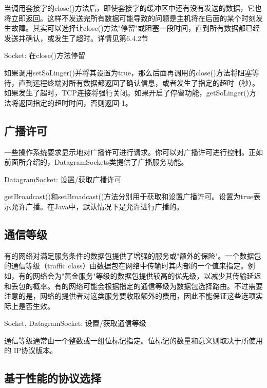 		当调用套接字的close()方法后，即使套接字的缓冲区中还有没有发送的数据，它也将立即返回。这样不发送完所有数据可能导致的问题是主机将在后面的某个时刻发生故障。其实可以选择让close()方法"停留"或阻塞一段时间，直到所有数据都已经发送并确认，或发生了超时。详情见第6.4.2节 

		Socket: 在close()方法停留 

		

		如果调用setSoLinger()并将其设置为true，那么后面再调用的close()方法将阻塞等待，直到远程终端对所有数据都返回了确认信息，或者发生了指定的超时（秒）。如果发生了超时，TCP连接将强行关闭。如果开启了停留功能，getSoLinger()方法将返回指定的超时时间，否则返回-1。 

	\subsection{广播许可}

		一些操作系统要求显示地对广播许可进行请求。你可以对广播许可进行控制。正如前面所介绍的，DatagramSockets类提供了广播服务功能。 

		DatagramSocket: 设置/获取广播许可 

		

		getBroadcast()和setBroadcast()方法分别用于获取和设置广播许可。设置为true表示允许广播。在Java中，默认情况下是允许进行广播的。 

	\subsection{通信等级}

		有的网络对满足服务条件的数据包提供了增强的服务或"额外的保险"。一个数据包的通信等级（traffic class）由数据包在网络中传输时其内部的一个值来指定。例如，有的网络会为"黄金服务"等级的数据包提供较高的优先级，以减少其传输延迟和丢包的概率。有的网络可能会根据指定的通信等级为数据包选择路由。不过需要注意的是，网络的提供者对这类服务要收取额外的费用，因此不能保证这些选项实际上是否生效。 

		Socket, DatagramSocket: 设置/获取通信等级 

		

		通信等级通常由一个整数或一组位标记指定。位标记的数量和意义则取决于所使用的
IP协议版本。 

	\subsection{基于性能的协议选择} 


